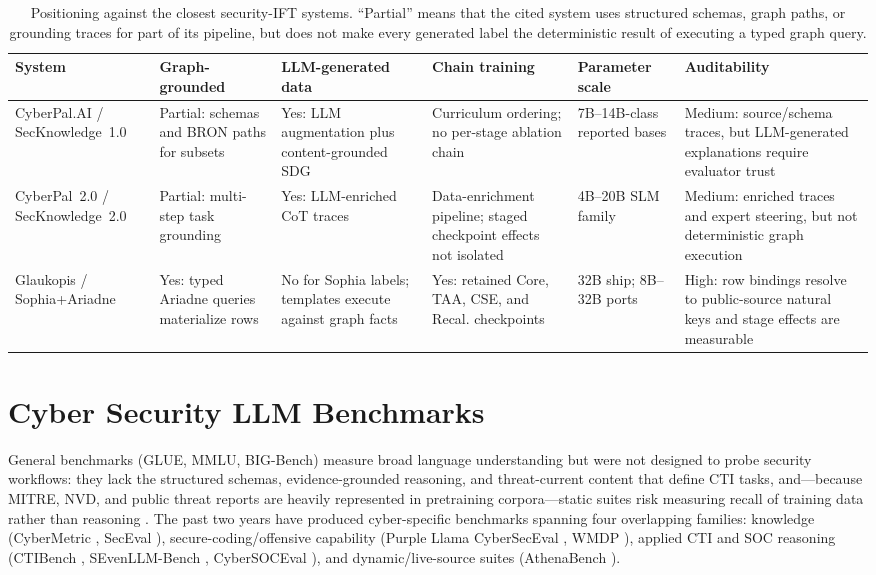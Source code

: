 \documentclass[conference]{IEEEtran}
\begin{document}
\begin{table}[t]
\centering
\caption{Positioning against the closest security-IFT systems. ``Partial'' means that the cited system uses structured schemas, graph paths, or grounding traces for part of its pipeline, but does not make every generated label the deterministic result of executing a typed graph query.}
\label{tab:positioning}
\scriptsize
\setlength{\tabcolsep}{3pt}
\begin{tabular}{p{2.3cm}p{2.1cm}p{2.2cm}p{2.5cm}p{2.1cm}p{3.3cm}}
\hline
\textbf{System} & \textbf{Graph-grounded} & \textbf{LLM-generated data} & \textbf{Chain training} & \textbf{Parameter scale} & \textbf{Auditability} \\
\hline
CyberPal.AI / SecKnowledge~1.0 \cite{levi2024cyberpal} & Partial: schemas and BRON paths for subsets & Yes: LLM augmentation plus content-grounded SDG & Curriculum ordering; no per-stage ablation chain & 7B--14B-class reported bases & Medium: source/schema traces, but LLM-generated explanations require evaluator trust \\
CyberPal~2.0 / SecKnowledge~2.0 \cite{levi2025toward} & Partial: multi-step task grounding & Yes: LLM-enriched CoT traces & Data-enrichment pipeline; staged checkpoint effects not isolated & 4B--20B SLM family & Medium: enriched traces and expert steering, but not deterministic graph execution \\
Glaukopis / Sophia+Ariadne & Yes: typed Ariadne queries materialize rows & No for Sophia labels; templates execute against graph facts & Yes: retained Core, TAA, CSE, and Recal. checkpoints & 32B ship; 8B--32B ports & High: row bindings resolve to public-source natural keys and stage effects are measurable \\
\hline
\end{tabular}
\end{table}

\section{Cyber Security LLM Benchmarks}
\label{sec:benchmarks}

General benchmarks (GLUE, MMLU, BIG-Bench) measure broad language understanding but were not designed to probe security workflows: they lack the structured schemas, evidence-grounded reasoning, and threat-current content that define CTI tasks, and---because MITRE, NVD, and public threat reports are heavily represented in pretraining corpora---static suites risk measuring recall of training data rather than reasoning \cite{athenabench2025}. The past two years have produced cyber-specific benchmarks spanning four overlapping families: knowledge (CyberMetric \cite{tihanyi2024cybermetric}, SecEval \cite{hu2024seceval}), secure-coding/offensive capability (Purple Llama CyberSecEval \cite{bhatt2023purplellama,bhatt2024cyberseceval2}, WMDP \cite{li2024wmdp}), applied CTI and SOC reasoning (CTIBench \cite{ctibench2024}, SEvenLLM-Bench \cite{ji2024sevenllm}, CyberSOCEval \cite{cybersoceval2025}), and dynamic/live-source suites (AthenaBench \cite{athenabench2025}).
\end{document}
